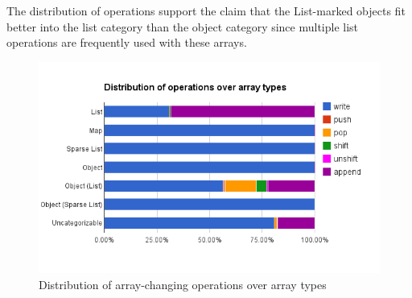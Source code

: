 The distribution of operations support the claim that the List-marked objects fit better into the list category than the object category since multiple list operations are frequently used with these arrays.

\begin{figure}[htbp]
\centering
\includegraphics[width=\textwidth]{chapters/study/g2.png}
\caption{Distribution of array-changing operations over array types}
\label{fig:type_operations}
\end{figure}